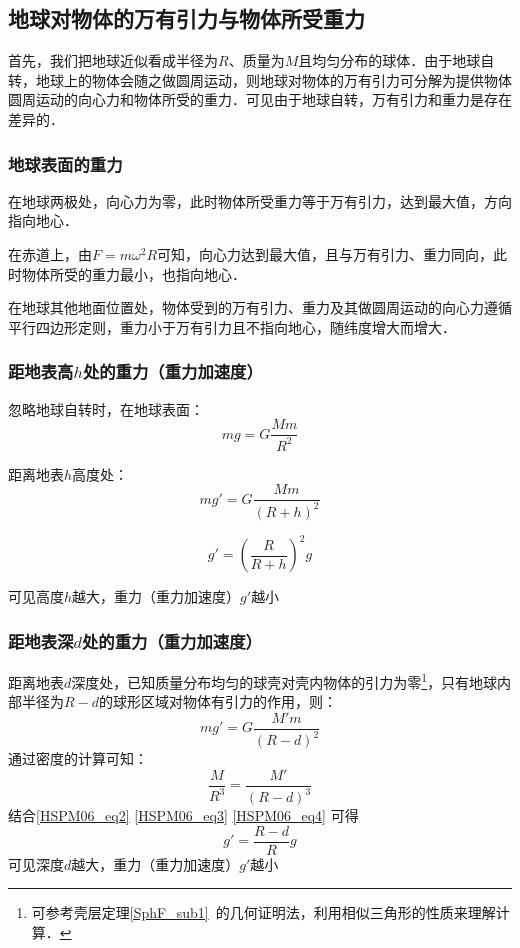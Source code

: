 \subsection{地球对物体的万有引力与物体所受重力}

首先，我们把地球近似看成半径为$R$、质量为$M$且均匀分布的球体．由于地球自转，地球上的物体会随之做圆周运动，则地球对物体的万有引力可分解为提供物体圆周运动的向心力和物体所受的重力．可见由于地球自转，万有引力和重力是存在差异的．

\subsubsection{地球表面的重力}

在地球两极处，向心力为零，此时物体所受重力等于万有引力，达到最大值，方向指向地心．

在赤道上，由$F=m\omega^2R$可知，向心力达到最大值，且与万有引力、重力同向，此时物体所受的重力最小，也指向地心．

在地球其他地面位置处，物体受到的万有引力、重力及其做圆周运动的向心力遵循平行四边形定则，重力小于万有引力且不指向地心，随纬度增大而增大．

\subsubsection{距地表高$h$处的重力（重力加速度）}

忽略地球自转时，在地球表面：
\begin{equation}\label{HSPM06_eq2}
mg=G\frac{Mm}{R^2}
\end{equation}

距离地表$h$高度处：
\begin{equation}
mg'=G\frac{Mm}{(R+h)^2}
\end{equation}

\begin{equation}
g'=(\frac{R}{R+h})^2g
\end{equation}

可见高度$h$越大，重力（重力加速度）$g'$越小

\subsubsection{距地表深$d$处的重力（重力加速度）}

距离地表$d$深度处，已知质量分布均匀的球壳对壳内物体的引力为零\footnote{可参考壳层定理\autoref{SphF_sub1}~的几何证明法，利用相似三角形的性质来理解计算．}，只有地球内部半径为$R-d$的球形区域对物体有引力的作用，则：
\begin{equation}\label{HSPM06_eq3}
mg'=G\frac{M'm}{(R-d)^2}
\end{equation}
通过密度的计算可知：
\begin{equation}\label{HSPM06_eq4}
\frac{M}{R^3}=\frac{M'}{(R-d)^3}
\end{equation}
结合\autoref{HSPM06_eq2} \autoref{HSPM06_eq3} \autoref{HSPM06_eq4} 可得
\begin{equation}
g'=\frac{R-d}{R}g
\end{equation}
可见深度$d$越大，重力（重力加速度）$g'$越小


